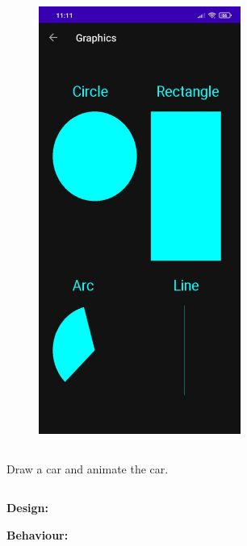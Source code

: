 \documentclass[12pt,letterpaper]{article}
\begin{document}
\subsection*{}
\begin{figure}[h]
    \centering
    \includegraphics[height=14cm, keepaspectratio]{Outputs/OP0.jpeg}
\end{figure}

\newpage
\subsection*{}
\begin{flushleft}
    Draw a car and animate the car.
\end{flushleft}

\subsection*{}
\subsubsection*{}
\textbf{Design:}
\begin{flushleft}

\end{flushleft}
\textbf{Behaviour:}
\begin{flushleft}

\end{flushleft}
\end{document}
